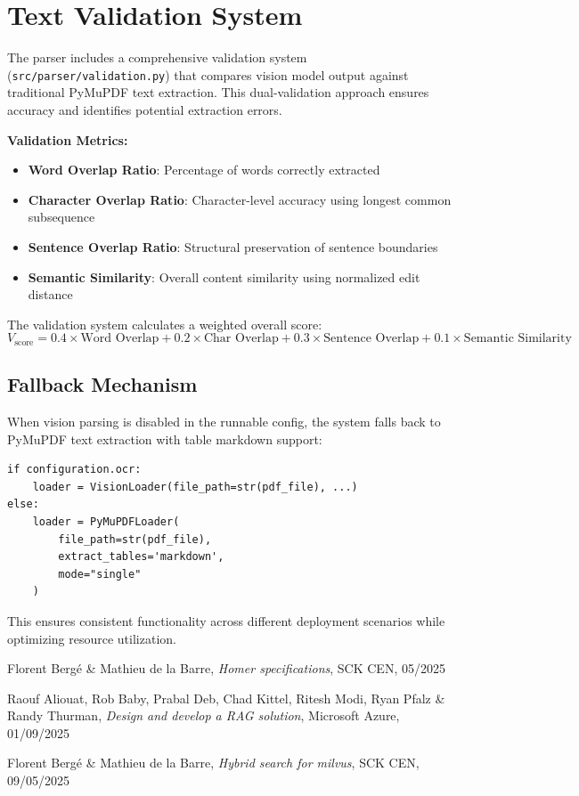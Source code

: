 \documentclass[11pt,a4paper]{report}
\begin{document}
\section{Text Validation System}

The parser includes a comprehensive validation system (\texttt{src/parser/validation.py}) that compares vision model output against traditional PyMuPDF text extraction. This dual-validation approach ensures accuracy and identifies potential extraction errors.

\textbf{Validation Metrics:}
\begin{itemize}
    \item \textbf{Word Overlap Ratio}: Percentage of words correctly extracted
    \item \textbf{Character Overlap Ratio}: Character-level accuracy using longest common subsequence
    \item \textbf{Sentence Overlap Ratio}: Structural preservation of sentence boundaries
    \item \textbf{Semantic Similarity}: Overall content similarity using normalized edit distance
\end{itemize}

The validation system calculates a weighted overall score:
\begin{equation}
V_{\text{score}} = 0.4 \times \text{Word Overlap} + 0.2 \times \text{Char Overlap} + 0.3 \times \text{Sentence Overlap} + 0.1 \times \text{Semantic Similarity}
\end{equation}

\subsection{Fallback Mechanism}

When vision parsing is disabled in the runnable config, the system falls back to PyMuPDF text extraction with table markdown support:

\begin{lstlisting}[caption={Parser fallback mechanism}]
if configuration.ocr:
    loader = VisionLoader(file_path=str(pdf_file), ...)
else:
    loader = PyMuPDFLoader(
        file_path=str(pdf_file),
        extract_tables='markdown',
        mode="single"
    )
\end{lstlisting}

This ensures consistent functionality across different deployment scenarios while optimizing resource utilization.




\begin{thebibliography}{9}

Florent Bergé \& Mathieu de la Barre, 
\textit{Homer specifications}, 
SCK CEN, 05/2025

Raouf Aliouat, Rob Baby, Prabal Deb, Chad Kittel, Ritesh Modi, Ryan Pfalz \& Randy Thurman, 
\textit{Design and develop a RAG solution}, 
Microsoft Azure, 01/09/2025

Florent Bergé \& Mathieu de la Barre, 
\textit{Hybrid search for milvus}, 
SCK CEN, 09/05/2025

\end{thebibliography}
\end{document}
